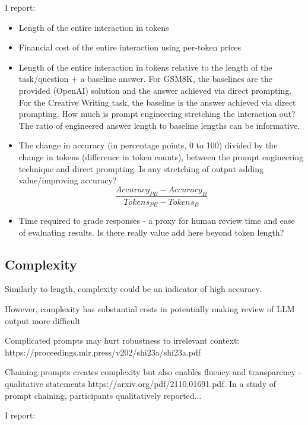 \documentclass[11pt]{article}
\begin{document}
I report:

\begin{itemize}
  \item Length of the entire interaction in tokens
  \item Financial cost of the entire interaction using per-token prices
  \item Length of the entire interaction in tokens relative to the length of the task/question + a baseline answer. For GSM8K, the baselines are the provided (OpenAI) solution and the answer achieved via direct prompting. For the Creative Writing task, the baseline is the answer achieved via direct prompting. How much is prompt engineering stretching the interaction out? The ratio of engineered answer length to baseline lengths can be informative.
  \item The change in accuracy (in percentage points, 0 to 100) divided by the change in tokens (difference in token counts), between the prompt engineering technique and direct prompting. Is any stretching of output adding value/improving accuracy? %
  \begin{displaymath}
    \frac{Accuracy_{PE} - Accuracy_{B}}{Tokens_{PE} - Tokens_{B}}
  \end{displaymath}
  \item Time required to grade responses - a proxy for human review time and ease of evaluating results. Is there really value add here beyond token length?
\end{itemize}

\subsection*{Complexity}

Similarly to length, complexity could be an indicator of high accuracy. 

However, complexity has substantial costs in potentially making review of LLM output more difficult

Complicated prompts may hurt robustness to irrelevant context: https://proceedings.mlr.press/v202/shi23a/shi23a.pdf

Chaining prompts creates complexity but also enables fluency and transparency - qualitative statements https://arxiv.org/pdf/2110.01691.pdf. In a study of prompt chaining, participants qualitatively reported...

I report:
\end{document}
